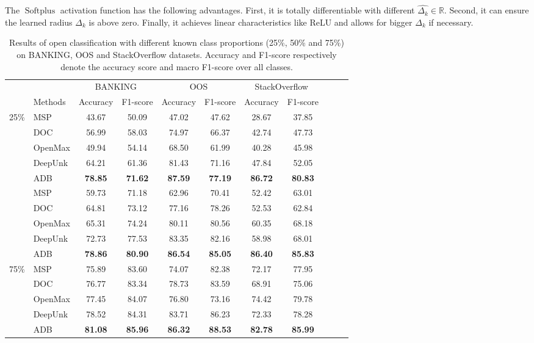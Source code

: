 \documentclass[letterpaper]{article} %
\begin{document}
The $\operatorname{Softplus}$ activation function has the following advantages. First, it is totally differentiable with different $\widehat{\Delta_{k}} \in \mathds R$. Second, it can ensure the learned radius $\Delta_{k}$ is above zero. Finally, it achieves linear characteristics like ReLU  and allows for bigger $\Delta_{k}$ if necessary.
\begin{table}[!t]\small
\centering
\begin{tabular}{@{\extracolsep{15pt}}clccccccccc}
\toprule
\centering
&  & \multicolumn{2}{c}{BANKING} & \multicolumn{2}{c}{OOS} & \multicolumn{2}{c}{StackOverflow} \\

\addlinespace[0.1cm]  \cline{3-4} \cline{5-6} \cline{7-8}  \addlinespace[0.1cm]
& Methods &  Accuracy & F1-score   & Accuracy & F1-score & Accuracy & F1-score\\
\midrule
\multirow{6}{*}[1ex]{25\%}
& MSP  & 43.67 & 50.09  & 47.02 & 47.62   & 28.67 & 37.85\\
& DOC  & 56.99 & 58.03  & 74.97 & 66.37  & 42.74 & 47.73\\
& OpenMax  & 49.94 & 54.14  & 68.50 & 61.99  & 40.28 & 45.98\\
& DeepUnk  & 64.21 & 61.36  & 81.43 & 71.16  & 47.84 & 52.05 \\
& ADB   & \textbf{78.85} & \textbf{71.62}  & \textbf{87.59} & \textbf{77.19}   & \textbf{86.72} & \textbf{80.83}\\
\midrule
\midrule
\multirow{6}{*}[1ex]{50\%}
& MSP & 59.73 & 71.18  & 62.96 & 70.41  & 52.42 & 63.01\\
& DOC  & 64.81 & 73.12  & 77.16 & 78.26    & 52.53 & 62.84 \\
& OpenMax  & 65.31 & 74.24  & 80.11 & 80.56  & 60.35 & 68.18\\
& DeepUnk  & 72.73 & 77.53  & 83.35 & 82.16  & 58.98 & 68.01 \\
& ADB 	&\textbf{78.86}	&\textbf{80.90}		&\textbf{86.54}	&\textbf{85.05}	&\textbf{86.40}	&\textbf{85.83}\\
\midrule
\midrule
\multirow{6}{*}[1ex]{ 75\%}
& MSP  & 75.89 & 83.60  & 74.07 & 82.38   & 72.17& 77.95\\
& DOC  & 76.77 & 83.34  & 78.73 & 83.59 & 68.91 & 75.06\\
& OpenMax  & 77.45 & 84.07  & 76.80 & 73.16   & 74.42 & 79.78\\
& DeepUnk  & 78.52 & 84.31  & 83.71 & 86.23  & 72.33 & 78.28\\
& ADB 	&\textbf{81.08}	&\textbf{85.96}		&\textbf{86.32}	&\textbf{88.53}	&\textbf{82.78}	&\textbf{85.99}\\
\bottomrule
\end{tabular}
\caption{ \label{results-main-1}
Results of open classification with different known class proportions (25\%, 50\% and 75\%) on BANKING, OOS and StackOverflow datasets. Accuracy and F1-score respectively denote the
accuracy score and macro F1-score over all classes.
}
\end{table}
\end{document}
